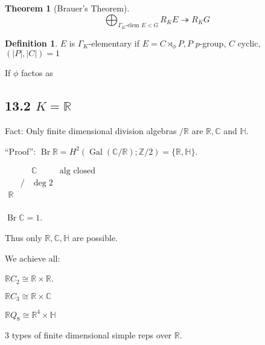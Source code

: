 \documentclass{article}
\theoremstyle{definition}
\newtheorem*{definition}{Definition}
\newtheorem{theorem}{Theorem}
\begin{document}
\begin{theorem}
    [Brauer's Theorem]

    \[
        \bigoplus_{\Gamma_{K}\text{-elem } E < G} R_K E \twoheadrightarrow R_K G 
    \]
\end{theorem}

\begin{definition}
    \(E\) is \(\Gamma_K\)-elementary if \(E = C \rtimes_{\phi} P, P\) \(p\)-group, \(C\) cyclic, \((\vert P \vert, \vert C \vert)=1\)

    If \(\phi\) factos as

    \begin{center}
    \end{center}
\end{definition}

\subsection*{13.2 \(K = \mathbb{R}\)}

Fact: Only finite dimensional division algebras \(/\mathbb{R}\) are \(\mathbb{R}, \mathbb{C}\) and \(\mathbb{H}\).

``Proof'': \(\operatorname{Br} \mathbb{R} = H^2(\operatorname{Gal}(\mathbb{C} / \mathbb{R}); \mathbb{Z} / 2) = \{ \mathbb{R} , \mathbb{H} \}\).

\(\begin{matrix}
     &  & \mathbb{C} &  \text{alg closed} \\
     & / & \deg 2 &   \\
    \mathbb{R} &  &  &   \\
\end{matrix}\)

\(\operatorname{Br} \mathbb{C} = 1\).

Thus only \(\mathbb{R} ,\mathbb{C} ,\mathbb{H}\) are possible.

We achieve all:

\(\mathbb{R} C_2 \cong \mathbb{R} \times \mathbb{R}\).

\(\mathbb{R} C_3 \cong \mathbb{R} \times \mathbb{C}\)

\(\mathbb{R}Q_8\cong \mathbb{R}^4 \times \mathbb{H}\)

3 types of finite dimensional simple reps over \(\mathbb{R}\).
\end{document}
